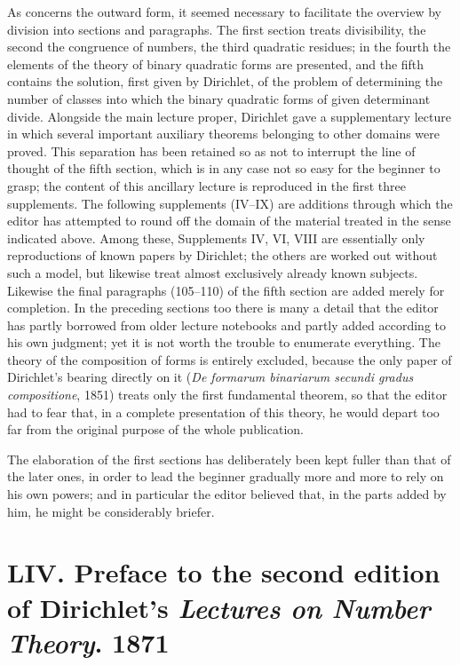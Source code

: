 \documentclass[11pt]{article}
\newcommand{\origpage}[1]{\par\vspace{0.25em}\noindent{\footnotesize\itshape [Printed page #1]}\par\vspace{0.25em}}
\begin{document}
\origpage{395}
As concerns the outward form, it seemed necessary to facilitate the overview by division into sections and paragraphs. The first section treats divisibility, the second the congruence of numbers, the third quadratic residues; in the fourth the elements of the theory of binary quadratic forms are presented, and the fifth contains the solution, first given by Dirichlet, of the problem of determining the number of classes into which the binary quadratic forms of given determinant divide. Alongside the main lecture proper, Dirichlet gave a supplementary lecture in which several important auxiliary theorems belonging to other domains were proved. This separation has been retained so as not to interrupt the line of thought of the fifth section, which is in any case not so easy for the beginner to grasp; the content of this ancillary lecture is reproduced in the first three supplements. The following supplements (IV--IX) are additions through which the editor has attempted to round off the domain of the material treated in the sense indicated above. Among these, Supplements IV, VI, VIII are essentially only reproductions of known papers by Dirichlet; the others are worked out without such a model, but likewise treat almost exclusively already known subjects. Likewise the final paragraphs (105--110) of the fifth section are added merely for completion. In the preceding sections too there is many a detail that the editor has partly borrowed from older lecture notebooks and partly added according to his own judgment; yet it is not worth the trouble to enumerate everything. The theory of the composition of forms is entirely excluded, because the only paper of Dirichlet's bearing directly on it (\textit{De formarum binariarum secundi gradus compositione}, 1851) treats only the first fundamental theorem, so that the editor had to fear that, in a complete presentation of this theory, he would depart too far from the original purpose of the whole publication.

\origpage{396}
The elaboration of the first sections has deliberately been kept fuller than that of the later ones, in order to lead the beginner gradually more and more to rely on his own powers; and in particular the editor believed that, in the parts added by him, he might be considerably briefer.

\section*{LIV. Preface to the second edition of Dirichlet's \textit{Lectures on Number Theory}. 1871}
\end{document}
